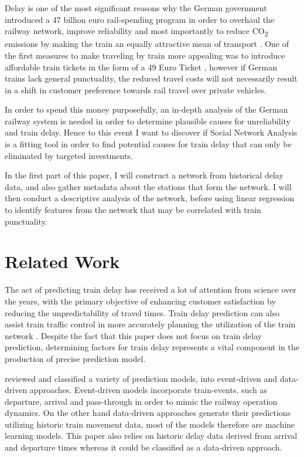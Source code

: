 \documentclass[12pt,a4paper]{article}
\begin{document}
Delay is one of the most significant reasons why the German government introduced a 47 billion euro rail-spending program in order to overhaul the railway network, improve reliability and most importantly to reduce CO\textsubscript{2} emissions by making the train an equally attractive mean of transport \citep{Scally2023}. 
One of the first measures to make traveling by train more appealing was to introduce affordable train tickets in the form of a 49 Euro Ticket \citep{DW2023}, however if German trains lack general punctuality, the reduced travel costs will not necessarily result in a shift in customer preference towards rail travel over private vehicles.

In order to spend this money purposefully, an in-depth analysis of the German railway system is needed in order to determine plausible causes for unreliability and train delay. 
Hence to this event I want to discover if Social Network Analysis is a fitting tool in order to find potential causes for train delay that can only be eliminated by targeted investments. 

In the first part of this paper, I will construct a network from historical delay data, and also gather metadata about the stations that form the network. 
I will then conduct a descriptive analysis of the network, before using linear regression to identify features from the network that may be correlated with train punctuality.

\maketitle
\section{\label{sec:Related Work}Related Work}

The act of predicting train delay has received a lot of attention from science over the years, with the primary objective of enhancing customer satisfaction by reducing the unpredictability of travel times. 
Train delay prediction can also assist train traffic control in more accurately planning the utilization of the train network \citep[p.~1]{Spanninger2022}. 
Despite the fact that this paper does not focus on train delay prediction, determining factors for train delay represents a vital component in the production of precise prediction model.

\cite{Spanninger2022} reviewed and classified a variety of prediction models, into event-driven and data-driven approaches. 
Event-driven models incorporate train-events, such as departure, arrival and pass-through in order to mimic the railway operation dynamics. 
On the other hand data-driven approaches generate their predictions utilizing historic train movement data, most of the models therefore are machine learning models. 
This paper also relies on historic delay data derived from arrival and departure times whereas it could be classified as a data-driven approach. 
\end{document}
